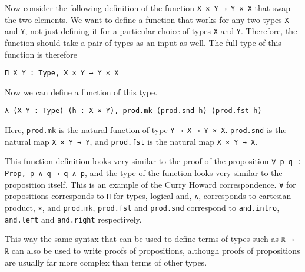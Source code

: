 \documentclass[12pt]{article} %
\theoremstyle{definition}
\theoremstyle{definition}
\theoremstyle{definition}
\theoremstyle{definition}
\theoremstyle{definition}
\theoremstyle{definition}
\begin{document}
Now consider the following definition of the function
\lstinline{X × Y → Y × X} that swap the two elements. We want to define a function
that works for any two types \lstinline{X} and \lstinline{Y}, not just defining it for
a particular choice of types \lstinline{X} and \lstinline{Y}. Therefore, the
function should take a pair of types as an input as well. The full type of this function
is therefore

\begin{lstlisting}
Π X Y : Type, X × Y → Y × X
\end{lstlisting}

Now we can define a function of this type.

\begin{lstlisting}
λ (X Y : Type) (h : X × Y), prod.mk (prod.snd h) (prod.fst h)
\end{lstlisting}

Here, \lstinline{prod.mk} is the natural function of type \lstinline{Y → X → Y × X}.
\lstinline{prod.snd} is the natural map \lstinline{X × Y → Y}, and \lstinline{prod.fst}
is the natural map \lstinline{X × Y → X}.

This function definition looks very similar to the proof of the proposition
\lstinline{∀ p q : Prop, p ∧ q → q ∧ p}, and the type of the function
looks very similar to the proposition itself. This is an example of the Curry Howard
correspondence.
\lstinline{∀} for propositions corresponds to \lstinline{Π} for types,
logical and, \lstinline{∧}, corresponds to cartesian product, \lstinline{×}, and
\lstinline{prod.mk}, \lstinline{prod.fst} and \lstinline{prod.snd} correspond to
\lstinline{and.intro}, \lstinline{and.left} and \lstinline{and.right} respectively.

This way the same syntax that can be used to define terms of types such as \lstinline{ℝ → ℝ}
can also be used to write proofs of propositions, although proofs of propositions are usually
far more complex than terms of other types.


\end{document}
